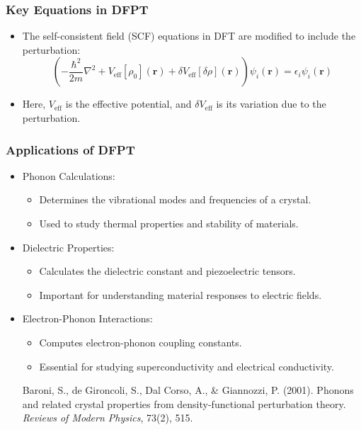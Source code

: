\documentclass{CustomBeamer}
\begin{document}
    \begin{frame}
    \frametitle{Key Equations in DFPT}
    \begin{itemize}
        \item The self-consistent field (SCF) equations in DFT are modified to include the perturbation:
        \begin{equation}
        \left( -\frac{\hbar^2}{2m} \nabla^2 + V_{\text{eff}}[\rho_0](\mathbf{r}) + \delta V_{\text{eff}}[\delta \rho](\mathbf{r}) \right) \psi_i(\mathbf{r}) = \epsilon_i \psi_i(\mathbf{r})
        \end{equation}
        \item Here, $V_{\text{eff}}$ is the effective potential, and $\delta V_{\text{eff}}$ is its variation due to the perturbation.
    \end{itemize}
    \end{frame}
    
    \begin{frame}
    \frametitle{Applications of DFPT}
    \begin{itemize}
        \item Phonon Calculations:
        \begin{itemize}
            \item Determines the vibrational modes and frequencies of a crystal.
            \item Used to study thermal properties and stability of materials.
        \end{itemize}
        \item Dielectric Properties:
        \begin{itemize}
            \item Calculates the dielectric constant and piezoelectric tensors.
            \item Important for understanding material responses to electric fields.
        \end{itemize}
        \item Electron-Phonon Interactions:
        \begin{itemize}
            \item Computes electron-phonon coupling constants.
            \item Essential for studying superconductivity and electrical conductivity.
        \end{itemize}

        Baroni, S., de Gironcoli, S., Dal Corso, A., \& Giannozzi, P. (2001). Phonons and related crystal properties from density-functional perturbation theory. \textit{Reviews of Modern Physics}, 73(2), 515.

    \end{itemize}
    \end{frame}
    
\end{document}
